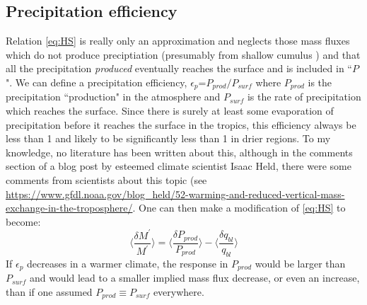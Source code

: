 \documentclass[letterpaper,12pt,titlepage,oneside,final]{book}
\begin{document}
\subsection{Precipitation efficiency}
Relation \ref{eq:HS} is really only an approximation and neglects those mass fluxes which do not produce preciptiation (presumably from shallow cumulus \citep{held_robust_2006}) and that all the precipitation \textit{produced} eventually reaches the surface and is included in ``$P$". We can define a precipitation efficiency, $\epsilon_{p}$=$P_{prod}/P_{surf}$ where $P_{prod}$ is the precipitation ``production" in the atmosphere and $P_{surf}$ is the rate of precipitation which reaches the surface. Since there is surely at least some evaporation of precipitation before it reaches the surface in the tropics, this efficiency always be less than 1 and likely to be significantly less than 1 in drier regions. To my knowledge, no literature has been written about this, although in the comments section of a blog post by esteemed climate scientist Isaac Held, there were some comments from scientists about this topic (see \url{https://www.gfdl.noaa.gov/blog_held/52-warming-and-reduced-vertical-mass-exchange-in-the-troposphere/}. One can then make a modification of \ref{eq:HS} to become: 
\begin{equation}\label{eq:HS1}
\Bigg\langle\frac{\delta{M^{'}}}{M^{'}}\Bigg\rangle=\Bigg\langle\frac{\delta{P_{prod}}}{P_{prod}}\Bigg\rangle-\Bigg\langle\frac{\delta{q_{bl}}}{q_{bl}}\Bigg\rangle
\end{equation}
If $\epsilon_{p}$ decreases in a warmer climate, the response in $P_{prod}$ would be larger than $P_{surf}$ and would lead to a smaller implied mass flux decrease, or even an increase, than if one assumed $P_{prod}\equiv{P_{surf}}$ everywhere. 
\end{document}
